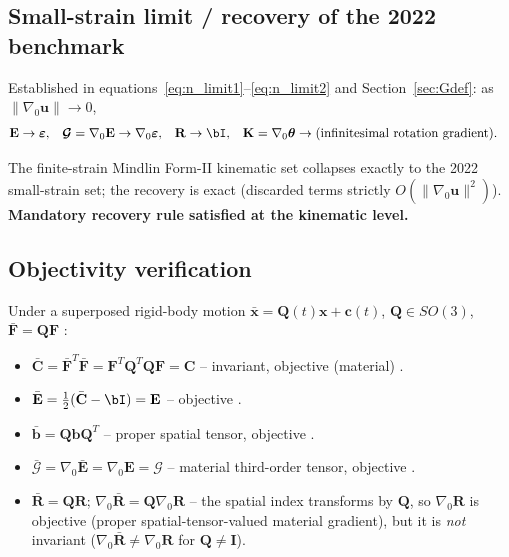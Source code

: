\documentclass[11pt]{article}
\newcommand{\gradz}{\nabla_{0}}
\newcommand{\bx}{\mathbf{x}}
\newcommand{\bu}{\mathbf{u}}
\newcommand{\bF}{\mathbf{F}}
\newcommand{\bC}{\mathbf{C}}
\newcommand{\bb}{\mathbf{b}}
\newcommand{\bE}{\mathbf{E}}
\newcommand{\bep}{\boldsymbol{\varepsilon}}
\newcommand{\bR}{\mathbf{R}}
\newcommand{\gradz}{\nabla_{0}}
\newcommand{\bx}{\mathbf{x}}
\newcommand{\bu}{\mathbf{u}}
\newcommand{\bF}{\mathbf{F}}
\newcommand{\bC}{\mathbf{C}}
\newcommand{\bb}{\mathbf{b}}
\newcommand{\bE}{\mathbf{E}}
\newcommand{\bep}{\boldsymbol{\varepsilon}}
\newcommand{\bR}{\mathbf{R}}
\newcommand{\bth}{\boldsymbol{\theta}}
\newcommand{\bK}{\mathbf{K}}
\begin{document}
\subsection{Small-strain limit / recovery of the 2022 benchmark}

Established in equations~\eqref{eq:n_limit1}--\eqref{eq:n_limit2} and
Section~\ref{sec:Gdef}: as $\|\gradz\bu\|\to0$,
\begin{align}
\bE &\to \bep, &
\bm{\mathcal{G}}=\gradz\bE &\to \gradz\bep, &
\bR &\to \bI, &
\bK=\gradz\bth &\to \text{(infinitesimal rotation gradient)}.
\end{align}

The finite-strain Mindlin Form-II kinematic set collapses exactly to the
2022 small-strain set; the recovery is exact (discarded terms strictly
$O(\|\gradz\bu\|^{2})$). \checkmark \textbf{Mandatory recovery rule
satisfied at the kinematic level.}

\subsection{Objectivity verification}
\label{sec:obj}

Under a superposed rigid-body motion
$\bar{\bx}=\mathbf{Q}(t)\bx+\mathbf{c}(t)$,
$\mathbf{Q}\in SO(3)$, $\bar{\bF}=\mathbf{Q}\bF$
\cite{Holzapfel2000,MarsdenHughes1983}:

\begin{itemize}
\item $\bar{\bC}=\bar{\bF}^{T}\bar{\bF}
=\bF^{T}\mathbf{Q}^{T}\mathbf{Q}\bF=\bC$ -- invariant, objective
(material) \checkmark.

\item $\bar{\bE}=\tfrac12(\bar{\bC}-\bI)=\bE$ -- objective \checkmark.

\item $\bar{\bb}=\mathbf{Q}\bb\mathbf{Q}^{T}$ -- proper spatial
tensor, objective \checkmark.

\item $\bar{\bm{\mathcal{G}}}=\gradz\bar{\bE}=\gradz\bE=\bm{\mathcal{G}}$ -- material
third-order tensor, objective \checkmark.

\item $\bar{\bR}=\mathbf{Q}\bR$; $\gradz\bar{\bR}=\mathbf{Q}\gradz\bR$ --
the spatial index transforms by $\mathbf{Q}$, so $\gradz\bR$ is
objective (proper spatial-tensor-valued material gradient), but it is
\emph{not} invariant ($\gradz\bar{\bR}\neq\gradz\bR$ for
$\mathbf{Q}\neq\mathbf{I}$). \checkmark
\end{itemize}
\end{document}
